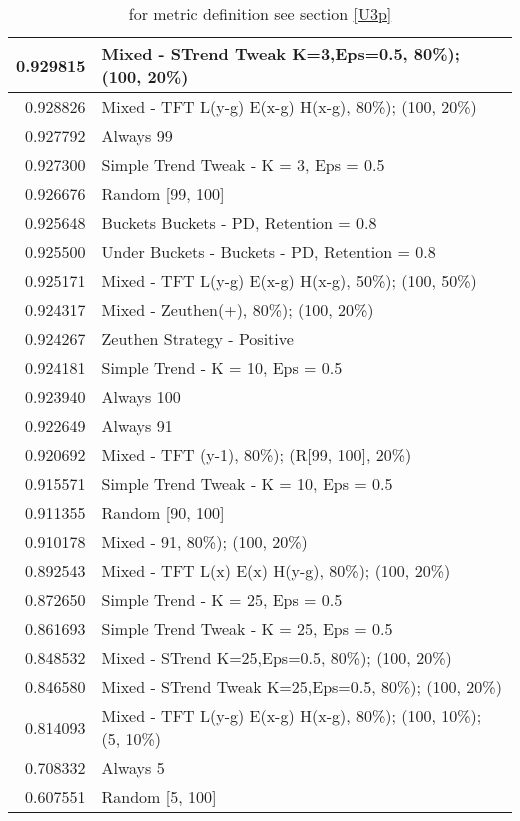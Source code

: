 \begin{table}[!hbtp]
\begin{footnotesize}
\begin{tabular}{|r|l|}
0.929815 & Mixed - {STrend Tweak K=3,Eps=0.5, 80\%); (100, 20\%)}\\ \hline
0.928826 & Mixed - {TFT L(y-g) E(x-g) H(x-g), 80\%); (100, 20\%)}\\ \hline
0.927792 & Always 99\\ \hline
0.927300 & Simple Trend Tweak - K = 3, Eps = 0.5\\ \hline
0.926676 & Random [99, 100]\\ \hline
0.925648 & Buckets Buckets - PD, Retention = 0.8\\ \hline
0.925500 & Under Buckets - Buckets - PD, Retention = 0.8\\ \hline
0.925171 & Mixed - {TFT L(y-g) E(x-g) H(x-g), 50\%); (100, 50\%)}\\ \hline
0.924317 & Mixed - {Zeuthen(+), 80\%); (100, 20\%)}\\ \hline
0.924267 & Zeuthen Strategy - Positive\\ \hline
0.924181 & Simple Trend - K = 10, Eps = 0.5\\ \hline
0.923940 & Always 100\\ \hline
0.922649 & Always 91\\ \hline
0.920692 & Mixed - {TFT (y-1), 80\%); (R[99, 100], 20\%)}\\ \hline
0.915571 & Simple Trend Tweak - K = 10, Eps = 0.5\\ \hline
0.911355 & Random [90, 100]\\ \hline
0.910178 & Mixed - {91, 80\%); (100, 20\%)}\\ \hline
0.892543 & Mixed - {TFT L(x) E(x) H(y-g), 80\%); (100, 20\%)}\\ \hline
0.872650 & Simple Trend - K = 25, Eps = 0.5\\ \hline
0.861693 & Simple Trend Tweak - K = 25, Eps = 0.5\\ \hline
0.848532 & Mixed - {STrend K=25,Eps=0.5, 80\%); (100, 20\%)}\\ \hline
0.846580 & Mixed - {STrend Tweak K=25,Eps=0.5, 80\%); (100, 20\%)}\\ \hline
0.814093 & Mixed - {TFT L(y-g) E(x-g) H(x-g), 80\%); (100, 10\%); (5, 10\%)}\\ \hline
0.708332 & Always 5\\ \hline
0.607551 & Random [5, 100]\\ \hline
\end{tabular}
\caption{for metric definition see section \eqref{U3p}}
\end{footnotesize}
\end{table}

